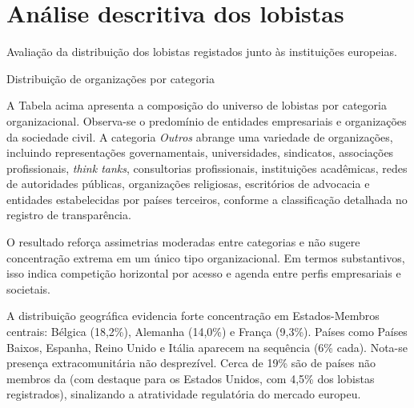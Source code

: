 \section{Análise descritiva dos lobistas}
\label{sec:resultados_descritica_lobistas}
Avaliação da distribuição dos lobistas registados junto às instituições europeias.

\begin{table}[!htbp]
\centering
\caption{Distribuição de organizações por categoria}

\end{table}

A Tabela acima apresenta a composição do universo de lobistas por categoria organizacional. Observa-se o predomínio de entidades empresariais e organizações da sociedade civil. A categoria \textit{Outros} abrange uma variedade de organizações, incluindo representações governamentais, universidades, sindicatos, associações profissionais, \textit{think tanks}, consultorias profissionais, instituições acadêmicas, redes de autoridades públicas, organizações religiosas, escritórios de advocacia e entidades estabelecidas por países terceiros, conforme a classificação detalhada no registro de transparência.

O resultado reforça assimetrias moderadas entre categorias e não sugere concentração extrema em um único tipo organizacional. Em termos substantivos, isso indica competição horizontal por acesso e agenda entre perfis empresariais e societais.

% 

A distribuição geográfica evidencia forte concentração em Estados-Membros centrais: Bélgica (18,2\%), Alemanha (14,0\%) e França (9,3\%). Países como Países Baixos, Espanha, Reino Unido e Itália aparecem na sequência (6\% cada). Nota-se presença extracomunitária não desprezível. Cerca de 19\% são de países não membros da \cite{UE} (com destaque para os Estados Unidos, com 4,5\% dos lobistas registrados), sinalizando a atratividade regulatória do mercado europeu.

